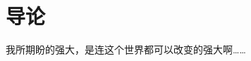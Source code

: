 \chapter{导论}
\begin{center}
    \textcolor[RGB]{255, 0, 0}{\faHeart}我所期盼的强大，是连这个世界都可以改变的强大啊……\textcolor[RGB]{255, 0, 0}{\faHeart}
\end{center}
\vspace{-5pt}
\begin{center}
\end{center}

